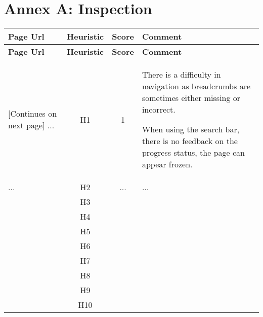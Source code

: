 
\section{Annex A: Inspection}

%
%
\begin{tabularx}{\linewidth}{p{3cm} c c X}
    \textbf{Page Url} & \textbf{Heuristic} & \textbf{Score} & \textbf{Comment} 
    \\ \midrule
    \endfirsthead
    \toprule
    \textbf{Page Url} & \textbf{Heuristic} & \textbf{Score} & \textbf{Comment}
    \\ \midrule
    \endhead
    \midrule
    \footnotesize [Continues on next page]
    \endfoot
    \bottomrule
    \endlastfoot
    ... & H1 & 1 & There is a difficulty in navigation as breadcrumbs are sometimes either missing or incorrect.\par When using the search bar, there is no feedback on the progress status, the page can appear frozen. \\ \midrule
    ... & H2 & ... & ... \\ \midrule
     & H3 &  & \\ \midrule
     & H4 &  & \\ \midrule
     & H5 &  & \\ \midrule
     & H6 &  & \\ \midrule
     & H7 &  & \\ \midrule
     & H8 &  & \\ \midrule
     & H9 &  & \\ \midrule
     & H10 & &
\end{tabularx}
    
